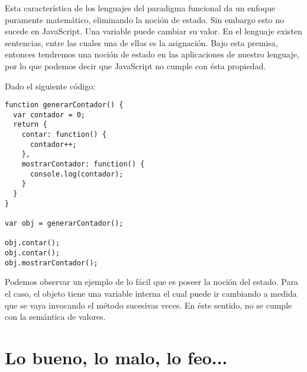 Esta característica de los lenguajes del paradigma funcional da un enfoque puramente matemático, eliminando la noción de estado. Sin embargo esto no sucede en JavaScript. Una variable puede cambiar su valor. En el lenguaje existen sentencias, entre las cuales una de ellas es la asignación. Bajo esta premisa, entonces tendremos una noción de estado en las aplicaciones de nuestro lenguaje, por lo que podemos decir que JavaScript no cumple con ésta propiedad.

Dado el siguiente código:

\begin{lstlisting}[title={Noción de estado}]
function generarContador() {
  var contador = 0;
  return {
    contar: function() {
      contador++;
    },
    mostrarContador: function() {
      console.log(contador);
    }
  }
}

var obj = generarContador();

obj.contar();
obj.contar();
obj.mostrarContador();
\end{lstlisting}

Podemos observar un ejemplo de lo fácil que es poseer la noción del estado. Para el caso, el objeto tiene una variable interna  el cual puede ir cambiando a medida que se vaya invocando el método  sucesivas veces. En éste sentido, no se cumple con la semántica de valores.

\section{Lo bueno, lo malo, lo feo...}
